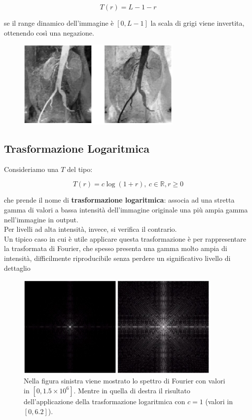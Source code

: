 $$
    T(r) = L - 1 - r
$$

se il range dinamico dell'immagine è $[0, L - 1]$
la scala di grigi viene invertita, ottenendo così una negazione.

\begin{figure}[H]
    \centering
    \includegraphics[width=8cm, keepaspectratio]{capitoli/immagini/imgs/angiografie_esempio_3.jpg}
\end{figure}

\subsection{Trasformazione Logaritmica}

Consideriamo una $T$ del tipo:

$$
    T(r) = c \log(1 + r), \ c \in  \mathbb{R}, r \geq 0
$$

che prende il nome di \textbf{trasformazione logaritmica}: associa ad una
stretta gamma di valori a bassa intensità dell'immagine originale
una più ampia gamma nell'immagine in output.\\
Per livelli ad alta intensità, invece, si verifica il contrario.\\
Un tipico caso in cui è utile applicare questa trasformazione è per
rappresentare la trasformata di Fourier, che spesso presenta una
gamma molto ampia di intensità, difficilmente riproducibile senza
perdere un significativo livello di dettaglio

\begin{figure}[H]
    \centering
    \includegraphics[width=10cm, keepaspectratio]{capitoli/immagini/imgs/trasformazione_logaritmica_esempio_4.jpg}
    \caption{Nella figura sinistra viene mostrato lo spettro di Fourier con valori in $[0, 1.5 \times 10^6]$. Mentre in quella di destra il risultato dell'applicazione della trasformazione logaritmica
        con $c = 1$ (valori in $[0, 6.2]$).
    }
\end{figure}

